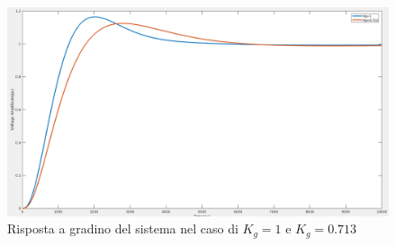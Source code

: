 \documentclass[Lau,noexaminfo]{sapthesis}
\begin{document}
	\begin{figure}
		\centering
			\includegraphics[scale=0.255]{step_k_modificato}
			\caption{Risposta a gradino del sistema nel caso di $K_g=1$ e $K_g=0.713$}
	\end{figure}
\end{document}
